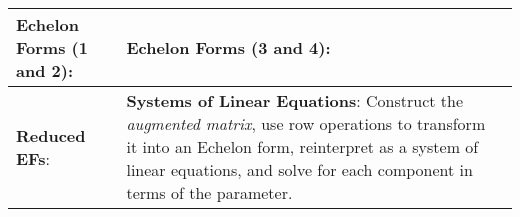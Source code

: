 \begin{tabular}{|m{.31\linewidth}|m{.31\linewidth}|m{.31\linewidth}|}
\textbf{Echelon Forms (1 and 2)}:
    \smash{$
        \begin{pmatrix}
            \star & \square & \square \\
            0 & \star & \square \\
            0 & 0 & \star
        \end{pmatrix}
        \begin{pmatrix}
            \star & \square & \square \\
            0 & \star & \square \\
            0 & 0 & 0
        \end{pmatrix}
    $} &

\textbf{Echelon Forms (3 and 4)}:
    \smash{$
        \begin{pmatrix}
            \star & \square & \square \\
            0 & 0 & \star \\
            0 & 0 & 0
        \end{pmatrix}
        \begin{pmatrix}
            \star & \square & \square \\
            0 & 0 & 0 \\
            0 & 0 & 0
        \end{pmatrix}
    $} \\

\hline

\textbf{Reduced EFs}:
    \smash{$
        \begin{pmatrix}
            \star & 0 & 0 \\
            0 & \star & 0 \\
            0 & 0 & \star
        \end{pmatrix}
        \begin{pmatrix}
            \star & 0 & \square \\
            0 & \star & \square \\
            0 & 0 & \star
        \end{pmatrix}
        \begin{pmatrix}
            \star & \square & 0 \\
            0 & 0 & \star \\
            0 & 0 & 0
        \end{pmatrix}
    $} &

\textbf{Systems of Linear Equations}:
    Construct the \emph{augmented matrix}, use row operations to transform it
    into an Echelon form, reinterpret as a system of linear equations, and solve
    for each component in terms of the parameter. &


\end{tabular}
